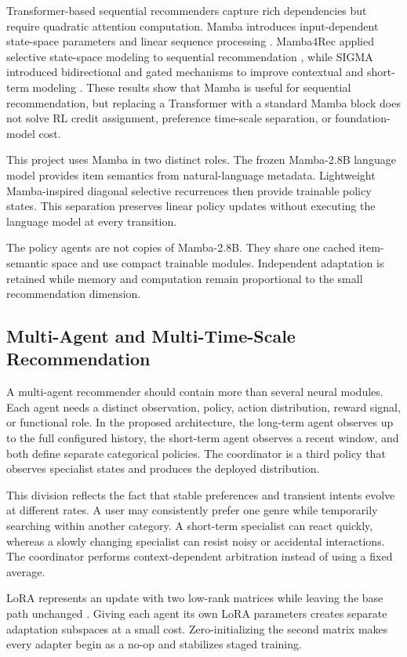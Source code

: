 \documentclass[11pt,a4paper]{article}
\begin{document}
Transformer-based sequential recommenders capture rich dependencies but require quadratic attention computation. Mamba introduces input-dependent state-space parameters and linear sequence processing \cite{MAMBA}. Mamba4Rec applied selective state-space modeling to sequential recommendation \cite{MAMBA4REC}, while SIGMA introduced bidirectional and gated mechanisms to improve contextual and short-term modeling \cite{SIGMA}. These results show that Mamba is useful for sequential recommendation, but replacing a Transformer with a standard Mamba block does not solve RL credit assignment, preference time-scale separation, or foundation-model cost.

This project uses Mamba in two distinct roles. The frozen Mamba-2.8B language model provides item semantics from natural-language metadata. Lightweight Mamba-inspired diagonal selective recurrences then provide trainable policy states. This separation preserves linear policy updates without executing the language model at every transition.

The policy agents are not copies of Mamba-2.8B. They share one cached
item-semantic space and use compact trainable modules. Independent adaptation
is retained while memory and computation remain proportional to the small
recommendation dimension.

\subsection{Multi-Agent and Multi-Time-Scale Recommendation}

A multi-agent recommender should contain more than several neural modules. Each agent needs a distinct observation, policy, action distribution, reward signal, or functional role. In the proposed architecture, the long-term agent observes up to the full configured history, the short-term agent observes a recent window, and both define separate categorical policies. The coordinator is a third policy that observes specialist states and produces the deployed distribution.

This division reflects the fact that stable preferences and transient intents evolve at different rates. A user may consistently prefer one genre while temporarily searching within another category. A short-term specialist can react quickly, whereas a slowly changing specialist can resist noisy or accidental interactions. The coordinator performs context-dependent arbitration instead of using a fixed average.

LoRA represents an update with two low-rank matrices while leaving the base path unchanged \cite{LORA}. Giving each agent its own LoRA parameters creates separate adaptation subspaces at a small cost. Zero-initializing the second matrix makes every adapter begin as a no-op and stabilizes staged training.
\end{document}
